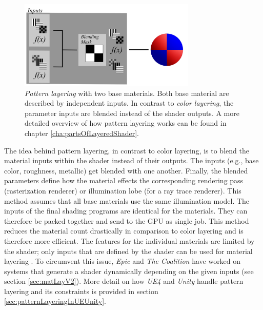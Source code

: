 	\begin{figure}
		\centering
		\includegraphics[width=0.75\textwidth]{images/03cha_04_patternLayering_1.jpg}
		\caption{
			\emph{Pattern layering} with two base materials. Both base material are described by independent inputs. In contrast to \emph{color layering}, the parameter inputs are blended instead of the shader outputs. A more detailed overview of how pattern layering works can be found in chapter \ref{cha:partsOfLayeredShader}.}
		\label{fig:patternLaering}
	\end{figure}
	
	The idea behind pattern layering, in contrast to color layering, is to blend the material inputs within the shader instead of their outputs. The inputs (e.g., base color, roughness, metallic) get blended with one another. Finally, the blended parameters define how the material effects the corresponding rendering pass (rasterization renderer) or illumination lobe (for a ray trace renderer). This method assumes that all base materials use the same illumination model. The inputs of the final shading programs are identical for the materials. They can therefore be packed together and send to the GPU as single job. This method reduces the material count drastically in comparison to color layering and is therefore more efficient. The features for the individual materials are limited by the shader; only inputs that are defined by the shader can be used for material layering \cite{pesare2017material}. To circumvent this issue, \emph{Epic} and \emph{The Coalition} have worked on systems that generate a shader dynamically depending on the given inputs (see section \ref{sec:matLayV2}). More detail on how \emph{UE4} and \emph{Unity} handle pattern layering and its constraints is provided in section \ref{sec:patternLayeringInUEUnity}. 

